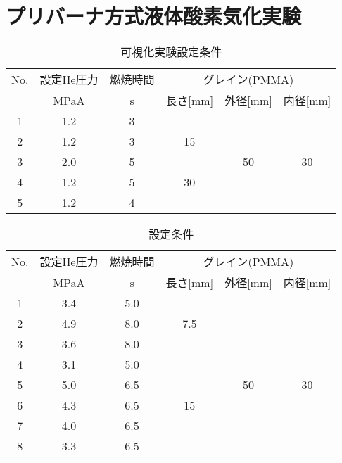 \chapter{プリバーナ方式液体酸素気化実験}
\newcommand{\FigAddThree}{./src/Chapter3/Figure}




\begin{table}[htb]
\begin{center}
\caption{可視化実験設定条件}
\small
\begin{tabular}{|c|c|c|c|c|c|} \hline
No. & 設定He圧力 & 燃焼時間 & \multicolumn{3}{|c|}{グレイン(PMMA)} \\ \cline{2-6}
 & MPaA & s & 長さ[mm] & 外径[mm] & 内径[mm]  \\ \hline
1 & 1.2 & 3 & & & \\ \cline{1-3}
2 & 1.2 & 3 & 15 & & \\ \cline{1-3}
3 & 2.0 & 5 & & 50 & 30  \\ \cline{1-4}
4 & 1.2 & 5 &30  &  & \\ \cline{1-3}
5 & 1.2 & 4 &  &  &  \\ \hline
\end{tabular}
\label{tab:S1TestCondition}
\end{center}
\end{table}

\begin{table}[htb]
\begin{center}
\caption{設定条件}
\small
\begin{tabular}{|c|c|c|c|c|c|} \hline
No. & 設定He圧力 & 燃焼時間 & \multicolumn{3}{|c|}{グレイン(PMMA)} \\ \cline{2-6}
 & MPaA & s & 長さ[mm] & 外径[mm] & 内径[mm]  \\ \hline
1 & 3.4 & 5.0 & & & \\ \cline{1-3}
2 & 4.9 & 8.0 &7.5 & & \\ \cline{1-3}
3 & 3.6 & 8.0 & & & \\ \cline{1-4}
4 & 3.1 & 5.0 & & & \\ \cline{1-4}
5 & 5.0 & 6.5 & & 50 & 30 \\ \cline{1-4}
6 & 4.3 & 6.5 & 15 & &  \\ \cline{1-4}
7 & 4.0 & 6.5 & & &  \\ \cline{1-4}
8 & 3.3 & 6.5 & & &  \\ \hline
\end{tabular}
\label{tab:S2TestCondition}
\end{center}
\end{table}

